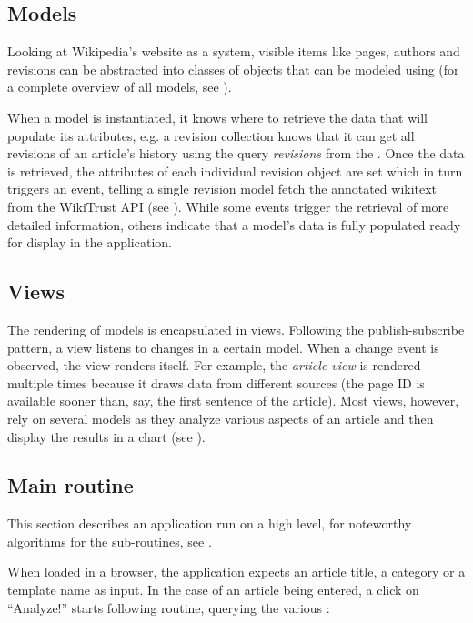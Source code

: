 \subsection{Models}

Looking at Wikipedia's website as a system, visible items like pages, authors and revisions can be abstracted into classes of objects that can be modeled using  (for a complete overview of  all models, see ).

When a model is instantiated, it knows where to retrieve the data that will populate its attributes, e.g. a revision collection knows that it can get all revisions of an article's history using the query \emph{revisions} from the  .
Once the data is retrieved, the attributes of each individual revision object are set which in turn triggers an event, telling a single revision model fetch the annotated wikitext from the WikiTrust API (see ).
While some events trigger the retrieval of more detailed information, others indicate that a model's data is fully populated ready for display in the application.

\subsection{Views}

The rendering of models is encapsulated in views.
Following the publish-subscribe pattern, a view listens to changes in a certain model.
When a change event is observed, the view renders itself.
For example, the \emph{article view} is rendered multiple times because it draws data from different sources (the page ID is available sooner than, say, the first sentence of the article). 
Most views, however, rely on several models as they analyze various aspects of an article and then display the results in a chart (see ).

\subsection{Main routine}

This section describes an application run on a high level, for noteworthy algorithms for the sub-routines, see .

When loaded in a browser, the application expects an article title, a category or a template name as input.
In the case of an article being entered, a click on ``Analyze!'' starts following routine, querying the various :

